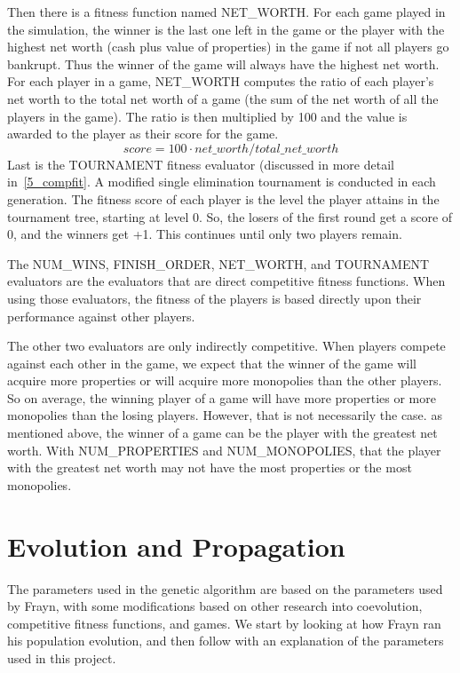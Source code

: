 Then there is a fitness function named NET\_WORTH. For each game played in the
simulation, the winner is the last one left in the game or the player with the
highest net worth (cash plus value of properties) in the game if not all players
go bankrupt. Thus the winner of the game will always have the highest net worth.
For each player in a game, NET\_WORTH computes the ratio of each player's net
worth to the total net worth of a game (the sum of the net worth of all the
players in the game). The ratio is then multiplied by 100 and the value is
awarded to the player as their score for the game.
\begin{equation*}
score = 100 \cdot net\_worth / total\_net\_worth
\end{equation*}
Last is the TOURNAMENT fitness evaluator (discussed in more detail
in~\ref{5_compfit}. A modified single elimination tournament is conducted in
each generation. The fitness score of each player is the level the player
attains in the tournament tree, starting at level 0. So, the losers of the first
round get a score of 0, and the winners get +1. This continues until only two
players remain.

The NUM\_WINS, FINISH\_ORDER, NET\_WORTH, and TOURNAMENT evaluators are the
evaluators that are direct competitive fitness functions. When using those
evaluators, the fitness of the players is based directly upon their performance
against other players.

The other two evaluators are only indirectly competitive. When players compete
against each other in the game, we expect that the winner of the game will
acquire more properties or will acquire more monopolies than the other players.
So on average, the winning player of a game will have more properties or more
monopolies than the losing players. However, that is not necessarily the case.
as mentioned above, the winner of a game can be the player with the greatest net
worth. With NUM\_PROPERTIES and NUM\_MONOPOLIES, that the player with the
greatest net worth may not have the most properties or the most monopolies.

\section{Evolution and Propagation} \label{5_evoprop}

The parameters used in the genetic algorithm are based on the parameters used by
Frayn, with some modifications based on other research into coevolution,
competitive fitness functions, and games. We start by looking at how Frayn ran
his population evolution, and then follow with an explanation of the parameters
used in this project.

